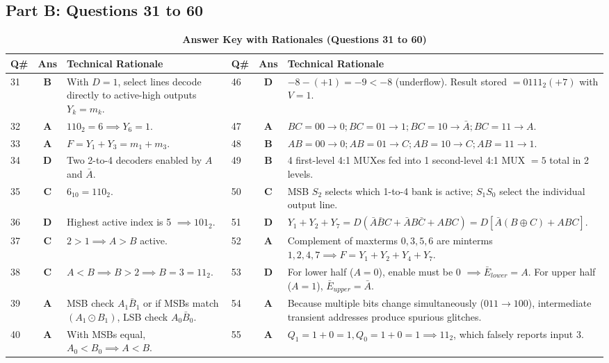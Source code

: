 \subsection*{Part B: Questions 31 to 60}
\begin{table}[htbp]
\centering
\caption{\textbf{Answer Key with Rationales (Questions 31 to 60)}}
\vspace{2mm}
\small
\begin{tabularx}{\textwidth}{l c X l c X}
\toprule
\textbf{Q\#} & \textbf{Ans} & \textbf{Technical Rationale} & \textbf{Q\#} & \textbf{Ans} & \textbf{Technical Rationale} \\
\midrule
31 & \textbf{B} & With $D=1$, select lines decode directly to active-high outputs $Y_k = m_k$. & 46 & \textbf{D} & $-8 - (+1) = -9 < -8$ (underflow). Result stored $= 0111_2 (+7)$ with $V=1$. \\
32 & \textbf{A} & $110_2 = 6 \implies Y_6 = 1$. & 47 & \textbf{A} & $BC=00\to 0; BC=01\to 1; BC=10\to \bar{A}; BC=11\to A$. \\
33 & \textbf{A} & $F = Y_1 + Y_3 = m_1 + m_3$. & 48 & \textbf{B} & $AB=00\to 0; AB=01\to C; AB=10\to C; AB=11\to 1$. \\
34 & \textbf{D} & Two 2-to-4 decoders enabled by $A$ and $\bar{A}$. & 49 & \textbf{B} & 4 first-level 4:1 MUXes fed into 1 second-level 4:1 MUX $= 5$ total in 2 levels. \\
35 & \textbf{C} & $6_{10} = 110_2$. & 50 & \textbf{C} & MSB $S_2$ selects which 1-to-4 bank is active; $S_1S_0$ select the individual output line. \\
36 & \textbf{D} & Highest active index is 5 $\implies 101_2$. & 51 & \textbf{D} & $Y_1+Y_2+Y_7 = D(\bar{A}\bar{B}C + \bar{A}B\bar{C} + ABC) = D[\bar{A}(B\oplus C) + ABC]$. \\
37 & \textbf{C} & $2 > 1 \implies A>B$ active. & 52 & \textbf{A} & Complement of maxterms $0,3,5,6$ are minterms $1,2,4,7 \implies F = Y_1+Y_2+Y_4+Y_7$. \\
38 & \textbf{C} & $A < B \implies B > 2 \implies B = 3 = 11_2$. & 53 & \textbf{D} & For lower half ($A=0$), enable must be 0 $\implies \bar{E}_{lower} = A$. For upper half ($A=1$), $\bar{E}_{upper} = \bar{A}$. \\
39 & \textbf{A} & MSB check $A_1\bar{B}_1$ or if MSBs match $(A_1 \odot B_1)$, LSB check $A_0\bar{B}_0$. & 54 & \textbf{A} & Because multiple bits change simultaneously ($011 \to 100$), intermediate transient addresses produce spurious glitches. \\
40 & \textbf{A} & With MSBs equal, $A_0 < B_0 \implies A < B$. & 55 & \textbf{A} & $Q_1 = 1+0=1, Q_0 = 1+0=1 \implies 11_2$, which falsely reports input 3. \\

\end{tabularx}
\end{table}
